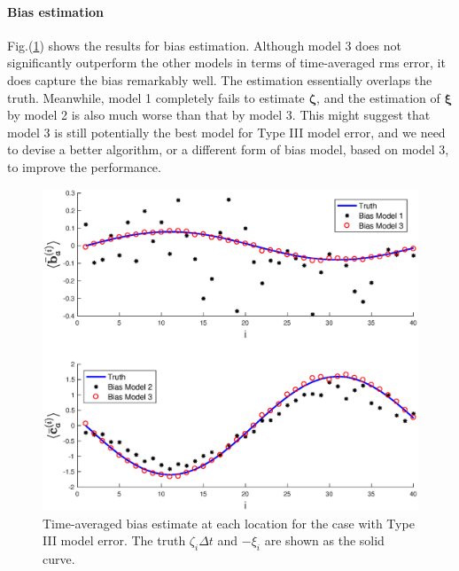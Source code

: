 \documentclass[twocolumn]{article}
\begin{document}
\paragraph{Bias estimation}
Fig.(\ref{BiasEstM3}) shows the results for bias estimation. Although model 3 does not significantly outperform the other models in terms of time-averaged rms error, it does capture the bias remarkably well. The estimation essentially overlaps the truth. Meanwhile, model 1 completely fails to estimate $\pmb{\zeta}$, and the estimation of $\pmb{\xi}$ by model 2 is also much worse than that by model 3. This might suggest that model 3 is still potentially the best model for Type III model error, and we need to devise a better algorithm, or a different form of bias model, based on model 3, to improve the performance.
\begin{figure} 
\centering
\includegraphics[scale=0.3]{Figures/BiasEstM3}
\caption{Time-averaged bias estimate at each location for the case with Type III model error. The truth $\zeta_i\Delta t$ and $-\xi_i$ are shown as the solid curve.}
\label{BiasEstM3}
\end{figure}
\end{document}
